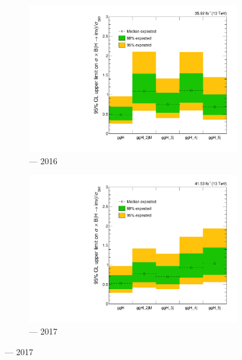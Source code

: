 \begin{figure}[htbp]
    \centering
    \begin{subfigure}[b]{0.45\textwidth}
        \includegraphics[width=\textwidth]{figures/limits/ggF/limit_2016_ggF_Scenario5.pdf}
        \caption{\ggH --- 2016}
    \end{subfigure}
    \hfill
    \begin{subfigure}[b]{0.45\textwidth}
        \includegraphics[width=\textwidth]{figures/limits/ggF/limit_2017_ggF_Scenario5.pdf}
        \caption{\ggH --- 2017}
    \end{subfigure}


\end{figure}
